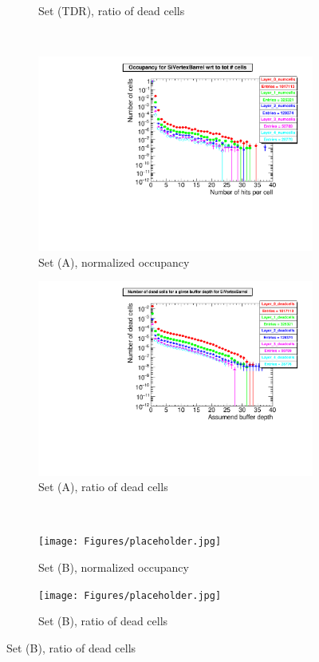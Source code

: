 \begin{figure}
\begin{subfigure}[b]{0.49\textwidth}
   \caption{Set (TDR), ratio of dead cells}
   \end{subfigure}\\
  \begin{subfigure}[b]{0.49\textwidth}
   \centering
    \includegraphics[width=\textwidth]{Figures/Pairs/occupancy_numcells_SiVertexBarrel_ILC250_setA.pdf}
   \caption{Set (A), normalized occupancy}
   \end{subfigure}
   \hfill
    \begin{subfigure}[b]{0.49\textwidth}
   \centering
    \includegraphics[width=\textwidth]{Figures/Pairs/occupancy_deadcells_SiVertexBarrel_ILC250_setA.pdf}
   \caption{Set (A), ratio of dead cells}
   \end{subfigure}\\
     \begin{subfigure}[b]{0.49\textwidth}
   \centering
    \texttt{[image: Figures/placeholder.jpg]}
   \caption{Set (B), normalized occupancy}
   \end{subfigure}
   \hfill
    \begin{subfigure}[b]{0.49\textwidth}
   \centering
    \texttt{[image: Figures/placeholder.jpg]}
   \caption{Set (B), ratio of dead cells}
   \end{subfigure}
  \end{figure}

